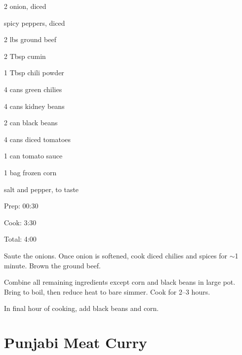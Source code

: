 \documentclass[oneside]{book}  %
\def\thisrecipe{}  %
\newcommand{\recipe}[1]{\section{#1}\def\thisrecipe{: #1}} %
\newcommand{\itemNL}{\item[] \hspace{-\labelsep}}  %
\newcommand{\about}{$\sim$}
\begin{document}
\begin{IT}
  \begin{ingredients}
    \item[2] onion, diced
    \itemNL spicy peppers, diced
    \item[2 lbs] ground beef
    \item[2 Tbsp] cumin
    \item[1 Tbsp] chili powder
    \item[4 cans] green chilies
    \item[4 cans] kidney beans
    \item[2 can] black beans
    \item[4 cans] diced tomatoes
    \item[1 can] tomato sauce
    \item[1 bag] frozen corn
    \itemNL salt and pepper, to taste
  \end{ingredients}

  \switchcolumn

  \begin{timeline}
    \item[Prep:]  00:30
    \item[Cook:]  3:30
    \item[Total:] 4:00
  \end{timeline}
\end{IT}

\begin{directions}
  \item Saute the onions. Once onion is softened, cook diced chilies and spices
    for \about 1 minute. Brown the ground beef.

  \item Combine all remaining ingredients except corn and black beans in large
    pot. Bring to boil, then reduce heat to bare simmer. Cook for 2--3 hours.

  \columnbreak

  \item In final hour of cooking, add black beans and corn.
\end{directions}
\recipe{Punjabi Meat Curry} \label{recipe:punjabi_meat_curry} %
\end{document}
